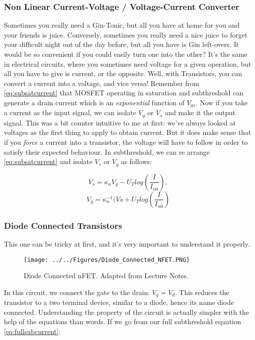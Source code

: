 \subsubsection{Non Linear Current-Voltage / Voltage-Current Converter}

Sometimes you really need a Gin-Tonic, but all you have at home for you and your friends is juice. Conversely, sometimes you really need a nice juice to forget your difficult night out of the day before, but all you have is Gin left-overs. It would be so convenient if you could easily turn one into the other? It's the same in electrical circuits, where you sometimes need voltage for a given operation, but all you have to give is current, or the opposite. Well, with Transistors, you can convert a current into a voltage, and vice versa! 
Remember from \ref{eq:subsatcurrent} that MOSFET operating in saturation and subthreshold can generate a drain current which is an \emph{exponential} function of $V_{gs}$. Now if you take a current as the input signal, we can isolate $V_g$ or $V_s$ and make it the output signal. This was a bit counter intuitive to me at first: we've always looked at voltages as the first thing to apply to obtain current. But it does make sense that if you \emph{force} a current into a transistor, the voltage will have to follow in order to satisfy their expected behaviour. In subthreshold, we can re arrange \ref{eq:subsatcurrent} and isolate $V_s$ or $V_g$ as follows:  

\begin{equation}
V_s = \kappa_n V_g - U_T log(\frac{I}{I_{n0}}),
\end{equation}
\begin{equation}
V_g = \kappa_n^{-1}(Vs + U_T log(\frac{I}{I_{n0}})
\end{equation}

\subsubsection{Diode Connected Transistors}

This one can be tricky at first, and it's very important to understand it properly. 

\begin{figure}[H]
    \centering
    \texttt{[image: ../../Figures/Diode\_Connected\_NFET.PNG]}
    \caption{Diode Connected nFET. Adapted from Lecture Notes.}
    \label{fig:diode_connected}
\end{figure}


In this circuit, we connect the gate to the drain: $V_g = V_d$. This reduces the transistor to a two terminal device, similar to a diode, hence its name diode connected. Understanding the property of the circuit is actually simpler with the help of the equations than words. If we go from our full subthreshold equation \ref{eq:fullsubcurrent}:

